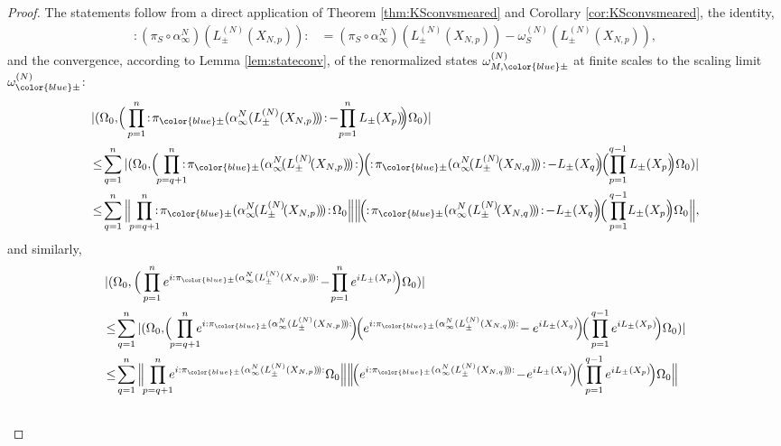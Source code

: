 \documentclass[a4paper, 11pt]{article}
\DeclareMathOperator{\1}{\mathds{1}}
\begin{document}
\begin{proof}
The statements follow from a direct application of Theorem \ref{thm:KSconvsmeared} and Corollary \ref{cor:KSconvsmeared}, the identity,
\begin{align*}
:\!(\pi_{S}\circ\alpha^{N}_{\infty})(L^{(N)}_{\pm}(X_{N,p})\!)\!: & = (\pi_{S}\circ\alpha^{N}_{\infty})(L^{(N)}_{\pm}(X_{N,p})\!)-\omega^{(N)}_{S}(L^{(N)}_{\pm}(X_{N,p})\!),
\end{align*}
and the convergence, according to Lemma \ref{lem:stateconv}, of the renormalized states $\omega^{(N)}_{M,{\color{blue}\pm}}$ at finite scales to the scaling limit $\omega^{(N)}_{{\color{blue}\pm}}$:
\begin{align}
\label{eq:corapproxvirestimate}
& |(\Omega_{0},\!\Big(\prod_{p=1}^{n}\!:\!\pi_{{\color{blue}\pm}}(\alpha^{N}_{\infty}(L^{(N)}_{\pm}(X_{N,p})\!)\!)\!:\!-\!\prod_{p=1}^{n}L_{\pm}(X_{p})\!)\!\!\Big)\Omega_{0})| \\ \nonumber
& \!\leq\!\sum^{n}_{q=1}|(\Omega_{0},\!\Big(\!\!\prod_{p=q+1}^{n}\!\!\!\!:\!\pi_{{\color{blue}\pm}}(\alpha^{N}_{\infty}\!(L^{(N)}_{\pm}\!(X_{N,p})\!)\!)\!:\!\!\Big)\!\Big(\!\!:\!\pi_{{\color{blue}\pm}}(\alpha^{N}_{\infty}\!(L^{(N)}_{\pm}\!(X_{N,q})\!)\!)\!:\!-L_{\pm}(X_{q})\!\!\Big)\!\Big(\!\prod_{p=1}^{q-1}L_{\pm}(X_{p})\!\!\Big)\Omega_{0})| \\ \nonumber
& \!\leq\!\sum^{n}_{q=1}\Big\|\!\!\prod_{p=q+1}^{n}\!\!\!\!:\!\pi_{{\color{blue}\pm}}(\alpha^{N}_{\infty}\!(L^{(N)}_{\pm}\!(X_{N,p})\!)\!)\!:\!\Omega_{0}\Big\|\Big\|\!\Big(\!\!:\!\pi_{{\color{blue}\pm}}(\alpha^{N}_{\infty}(L^{(N)}_{\pm}\!(X_{N,q})\!)\!)\!:\!-L_{\pm}(X_{q})\!\!\Big)\!\Big(\prod_{p=1}^{q-1}\!L_{\pm}(X_{p})\!\!\Big)\Omega_{0}\Big\|,
\end{align}
and similarly,
\begin{align}
\label{eq:corapproxvirestimateunitary}
& |(\Omega_{0},\Big(\prod_{p=1}^{n}e^{i:\pi_{{\color{blue}\pm}}(\alpha^{N}_{\infty}(L^{(N)}_{\pm}(X_{N,p})\!)\!):}\!-\!\prod_{p=1}^{n}e^{iL_{\pm}(X_{p})}\!\Big)\Omega_{0})| \\ \nonumber
& \!\leq\!\sum^{n}_{q=1}|(\Omega_{0},\!\Big(\!\!\prod_{p=q+1}^{n}\!\!\!e^{i:\pi_{{\color{blue}\pm}}(\alpha^{N}_{\infty}(L^{(N)}_{\pm}(X_{N,p})\!)\!):}\!\Big)\!\Big(e^{i:\pi_{{\color{blue}\pm}}(\alpha^{N}_{\infty}(L^{(N)}_{\pm}(X_{N,q})\!)\!):}\!-e^{iL_{\pm}(X_{q})}\!\Big)\!\Big(\prod_{p=1}^{q-1}e^{iL_{\pm}(X_{p})}\!\Big)\Omega_{0})| \\ \nonumber
& \!\leq\! \sum^{n}_{q=1}\Big\|\!\!\prod_{p=q+1}^{n}\!\!\!e^{i:\pi_{{\color{blue}\pm}}(\alpha^{N}_{\infty}(L^{(N)}_{\pm}(X_{N,p})\!)\!):}\Omega_{0}\Big\|\Big\|\!\Big(e^{i:\pi_{{\color{blue}\pm}}(\alpha^{N}_{\infty}(L^{(N)}_{\pm}(X_{N,q})\!)\!):}\!-\!e^{iL_{\pm}(X_{q})}\!\Big)\!\Big(\prod_{p=1}^{q-1}e^{iL_{\pm}(X_{p})}\!\Big)\Omega_{0}\Big\| \\ \nonumber

\end{align}
\end{proof}
\end{document}
